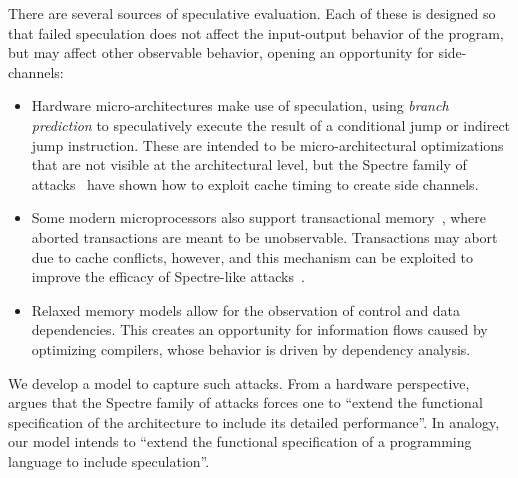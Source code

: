 There are several sources of speculative evaluation.  Each of these is
designed so that failed speculation does not affect the input-output behavior
of the program, but may affect other observable behavior, opening an opportunity
for side-channels:
\begin{itemize}
\item Hardware micro-architectures make use of
  speculation, using \emph{branch prediction}
  to speculatively execute the result of
  a conditional jump or indirect jump instruction.
  These are intended to be micro-architectural optimizations
  that are not visible at the architectural level, but
  the Spectre family of
  attacks~\cite{DBLP:journals/corr/abs-1801-01203} have shown how to exploit
  cache timing to create side channels.
\item Some modern microprocessors also support transactional
  memory~\cite{ChongSW18}, where aborted transactions are meant to be
  unobservable.  Transactions may abort due to cache conflicts, however, and
  this mechanism can be exploited to improve the efficacy of Spectre-like
  attacks~\cite{DBLP:conf/uss/DisselkoenKPT17}.
\item Relaxed memory models
  \cite{Manson:2005:JMM:1047659.1040336,Boehm:2008:FCC:1375581.1375591,DBLP:conf/popl/ZhaoNMZ12}
  allow for the observation of control and data dependencies. This creates an
  opportunity for information flows caused by optimizing compilers, whose
  behavior is driven by dependency analysis.
\end{itemize}
We develop a model to capture such attacks.  From a hardware perspective, ~\citet{Chien:2018} argues that  the Spectre family of attacks forces one to
``extend the functional specification of the architecture to include its detailed performance''.    In analogy, our model intends to ``extend the functional specification of a programming language  to include speculation''.
%

